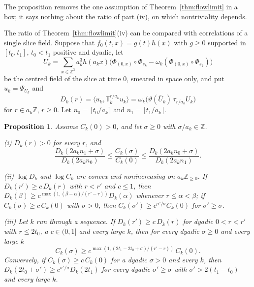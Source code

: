 \documentclass[11pt]{amsart}
\newtheorem{proposition}[theorem]{Proposition}
\theoremstyle{definition}
\theoremstyle{remark}
\numberwithin{equation}{section}
\newcommand{\Z}{\mathbb{Z}}
\newcommand{\ip}[2]{\langle #1,#2\rangle}
\begin{document}
The proposition removes the one assumption of Theorem~\ref{thm:flowlimit} in a
box; it says nothing about the ratio of part (iv), on which nontriviality
depends.

The ratio of Theorem~\ref{thm:flowlimit}(iv) can be compared with
correlations of a single slice field. Suppose that $f_0(t,x)=g(t)h(x)$ with
$g\ge0$ supported in $[t_0,t_1]$, $t_0<t_1$ positive and dyadic, let
\[
U_k=\sum_{x\in\Z^3}a_k^3h(a_kx)\bigl(\Phi_{(0,x)}\circ\Phi_{s_k}
-\omega_k(\Phi_{(0,x)}\circ\Phi_{s_k})\bigr)
\]
be the centred field of the slice at time $0$, smeared in space only, and put
$u_k=\Psi_{U_k}$ and
\[
D_k(r)=\ip{u_k}{\mathbb T_k^{r/a_k}u_k}
=\omega_k\bigl(\vartheta(\bar U_k)\,\tau_{r/a_k}U_k\bigr)
\]
for $r\in a_k\Z$, $r\ge0$. Let $n_0=\lceil t_0/a_k\rceil$ and
$n_1=\lfloor t_1/a_k\rfloor$.

\begin{proposition}\label{prop:sliceratio}
Assume $C_k(0)>0$, and let $\sigma\ge0$ with $\sigma/a_k\in\Z$.

\textup{(i)} $D_k(r)>0$ for every $r$, and
\[
\frac{D_k(2a_kn_1+\sigma)}{D_k(2a_kn_0)}\le\frac{C_k(\sigma)}{C_k(0)}\le
\frac{D_k(2a_kn_0+\sigma)}{D_k(2a_kn_1)} .
\]

\textup{(ii)} $\log D_k$ and $\log C_k$ are convex and nonincreasing on
$a_k\Z_{\ge0}$. If $D_k(r')\ge c\,D_k(r)$ with $r<r'$ and $c\le1$,
then $D_k(\beta)\ge c^{\max(1,(\beta-\alpha)/(r'-r))}D_k(\alpha)$ whenever
$r\le\alpha<\beta$; if $C_k(\sigma)\ge c\,C_k(0)$ with $\sigma>0$, then
$C_k(\sigma')\ge c^{\sigma'/\sigma}C_k(0)$ for $\sigma'\ge\sigma$.

\textup{(iii)} Let $k$ run through a sequence. If
$D_k(r')\ge c\,D_k(r)$ for dyadic $0<r<r'$ with $r\le2t_0$, a
$c\in(0,1]$ and every large $k$, then for every dyadic $\sigma\ge0$ and every
large $k$
\[
C_k(\sigma)\ge c^{\max(1,(2t_1-2t_0+\sigma)/(r'-r))}\,C_k(0).
\]
Conversely, if $C_k(\sigma)\ge c\,C_k(0)$ for a dyadic $\sigma>0$ and every
$k$, then $D_k(2t_0+\sigma')\ge c^{\sigma'/\sigma}D_k(2t_1)$ for every dyadic
$\sigma'\ge\sigma$ with $\sigma'>2(t_1-t_0)$ and every large $k$.
\end{proposition}
\end{document}
